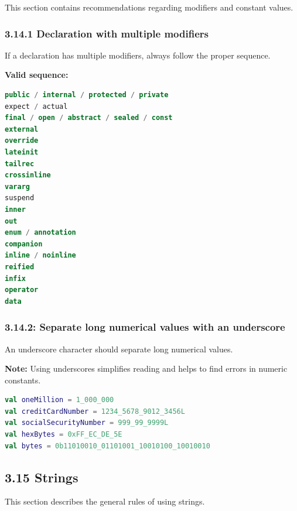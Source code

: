 \label{sec:3.14}

This section contains recommendations regarding modifiers and constant values.

\subsubsection*{\textbf{3.14.1 Declaration with multiple modifiers}}
\leavevmode\newline

\label{sec:3.14.1}

If a declaration has multiple modifiers, always follow the proper sequence.

\textbf{Valid sequence:}



\begin{lstlisting}[language=Kotlin]
public / internal / protected / private
expect / actual
final / open / abstract / sealed / const
external
override
lateinit
tailrec
crossinline
vararg
suspend
inner
out
enum / annotation
companion
inline / noinline
reified
infix
operator
data
\end{lstlisting}


\subsubsection*{\textbf{3.14.2: Separate long numerical values with an underscore}}
\leavevmode\newline

\label{sec:3.14.2}

An underscore character should separate long numerical values.

\textbf{Note:} Using underscores simplifies reading and helps to find errors in numeric constants.

\begin{lstlisting}[language=Kotlin]
val oneMillion = 1_000_000
val creditCardNumber = 1234_5678_9012_3456L
val socialSecurityNumber = 999_99_9999L
val hexBytes = 0xFF_EC_DE_5E
val bytes = 0b11010010_01101001_10010100_10010010
\end{lstlisting}


\subsection*{\textbf{3.15 Strings}}

\label{sec:3.15}

This section describes the general rules of using strings.



